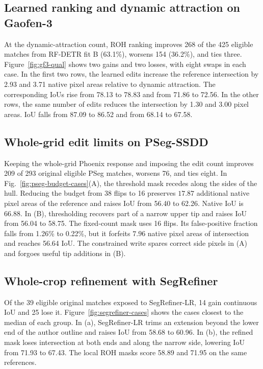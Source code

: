\documentclass[journal]{IEEEtran}
\begin{document}
\subsection{Learned ranking and dynamic attraction on Gaofen-3}

At the dynamic-attraction count, ROH ranking improves 268 of the 425 eligible matches from RF-DETR fit B (63.1\%), worsens 154 (36.2\%), and ties three. Figure~\ref{fig:gf3-qual} shows two gains and two losses, with eight swaps in each case. In the first two rows, the learned edits increase the reference intersection by 2.93 and 3.71 native pixel areas relative to dynamic attraction. The corresponding IoUs rise from 78.13 to 78.83 and from 71.86 to 72.56. In the other rows, the same number of edits reduces the intersection by 1.30 and 3.00 pixel areas. IoU falls from 87.09 to 86.52 and from 68.14 to 67.58.

\subsection{Whole-grid edit limits on PSeg-SSDD}

Keeping the whole-grid Phoenix response and imposing the edit count improves 209 of 293 original eligible PSeg matches, worsens 76, and ties eight. In Fig.~\ref{fig:pseg-budget-cases}(A), the threshold mask recedes along the sides of the hull. Reducing the budget from 38 flips to 16 preserves \(17.87\) additional native pixel areas of the reference and raises IoU from 56.40 to 62.26. Native IoU is 66.88. In (B), thresholding recovers part of a narrow upper tip and raises IoU from 56.04 to 58.75. The fixed-count mask uses 16 flips. Its false-positive fraction falls from 1.26\% to 0.22\%, but it forfeits \(7.96\) native pixel areas of intersection and reaches 56.64 IoU. The constrained write spares correct side pixels in (A) and forgoes useful tip additions in (B).

\subsection{Whole-crop refinement with SegRefiner}

Of the 39 eligible original matches exposed to SegRefiner-LR, 14 gain continuous IoU and 25 lose it. Figure~\ref{fig:segrefiner-cases} shows the cases closest to the median of each group. In (a), SegRefiner-LR trims an extension beyond the lower end of the author outline and raises IoU from 58.68 to 60.96. In (b), the refined mask loses intersection at both ends and along the narrow side, lowering IoU from 71.93 to 67.43. The local ROH masks score 58.89 and 71.95 on the same references.
\end{document}
